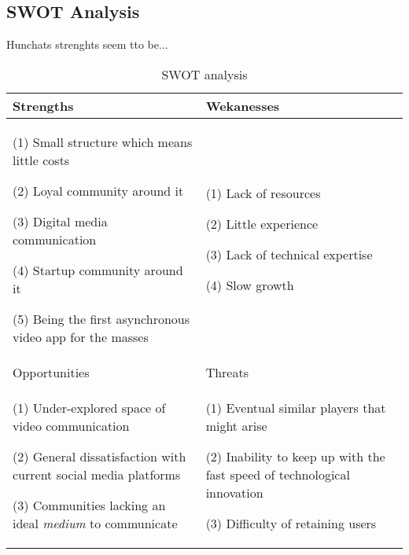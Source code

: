\documentclass[12pt]{article}
\begin{document}
\subsection{SWOT Analysis}
Hunchats strenghts seem tto be...

\begin{table}[htbp]
\small
\caption{SWOT analysis}
\label{table:swot}
\centering
\begin{tabular}{ @{}P{0.48\textwidth}P{0.48\textwidth}@{} }
\hline
Strengths                             &  Wekanesses                                                                                                                                                                                                                                                                                                                                                            
\\ \hline  
(1) Small structure which means little costs \par (2) Loyal community around it \par (3) Digital media communication \par (4) Startup community around it \par 	(5) Being the first asynchronous video app for the masses & (1) Lack of resources \par (2) Little experience \par (3) Lack of technical expertise \par (4) Slow growth       \\                                                                                                                                                                                                                    \hline
Opportunities		&	Threats
\\ \hline
 (1) Under-explored space of video communication \par (2) General dissatisfaction with current social media platforms \par (3) Communities lacking an ideal \textit{medium} to communicate 		&  (1) Eventual similar players that might arise \par (2) Inability to keep up with the fast speed of technological innovation \par (3) Difficulty of retaining users 
 \\ \hline
\end{tabular}
\end{table}
\end{document}
